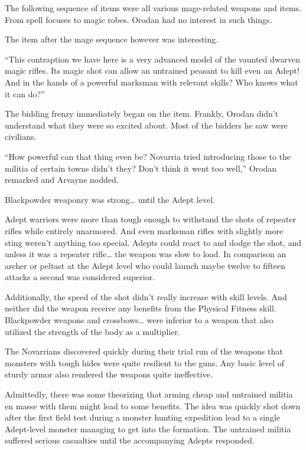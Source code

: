 \documentclass[a4paper,10pt]{book}
\begin{document}
The following sequence of items were all various mage-related weapons and items. From spell focuses to magic robes. Orodan had no interest in such things.\par
The item after the mage sequence however was interesting.\par
“This contraption we have here is a very advanced model of the vaunted dwarven magic rifles. Its magic shot can allow an untrained peasant to kill even an Adept! And in the hands of a powerful marksman with relevant skills? Who knows what it can do?”\par
The bidding frenzy immediately began on the item. Frankly, Orodan didn’t understand what they were so excited about. Most of the bidders he saw were civilians.\par
“How powerful can that thing even be? Novarria tried introducing those to the militia of certain towns didn’t they? Don’t think it went too well,” Orodan remarked and Arvayne nodded.\par
Blackpowder weaponry was strong… until the Adept level.\par
Adept warriors were more than tough enough to withstand the shots of repeater rifles while entirely unarmored. And even marksman rifles with slightly more sting weren’t anything too special. Adepts could react to and dodge the shot, and unless it was a repeater rifle… the weapon was slow to load. In comparison an archer or peltast at the Adept level who could launch maybe twelve to fifteen attacks a second was considered superior.\par
Additionally, the speed of the shot didn’t really increase with skill levels. And neither did the weapon receive any benefits from the Physical Fitness skill. Blackpowder weapons and crossbows… were inferior to a weapon that also utilized the strength of the body as a multiplier.\par
The Novarrians discovered quickly during their trial run of the weapons that monsters with tough hides were quite resilient to the guns. Any basic level of sturdy armor also rendered the weapons quite ineffective.\par
Admittedly, there was some theorizing that arming cheap and untrained militia en masse with them might lead to some benefits. The idea was quickly shot down after the first field test during a monster hunting expedition lead to a single Adept-level monster managing to get into the formation. The untrained militia suffered serious casualties until the accompanying Adepts responded.\par
\end{document}
